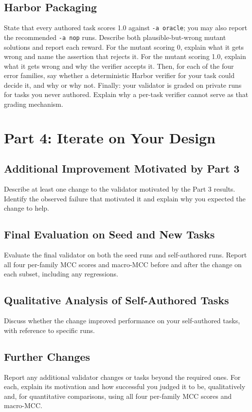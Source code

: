 \documentclass[11pt]{article}
\begin{document}
\subsection{Harbor Packaging}
State that every authored task scores 1.0 against \texttt{-a oracle}; you may
also report the recommended \texttt{-a nop} runs. Describe both plausible-but-wrong
mutant solutions and report each reward. For the mutant scoring 0, explain what
it gets wrong and name the assertion that rejects it. For the mutant scoring
1.0, explain what it gets wrong and why the verifier accepts it. Then, for each
of the four error families, say whether a deterministic Harbor verifier for your
task could decide it, and why or why not. Finally: your validator is graded on
private runs for tasks you never authored. Explain why a per-task verifier
cannot serve as that grading mechanism.

\section{Part 4: Iterate on Your Design}

\subsection{Additional Improvement Motivated by Part 3}
Describe at least one change to the validator motivated by the Part 3 results.
Identify the observed failure that motivated it and explain why you expected
the change to help.

\subsection{Final Evaluation on Seed and New Tasks}
Evaluate the final validator on both the seed runs and self-authored runs.
Report all four per-family MCC scores and macro-MCC before and after the change on each subset,
including any regressions.

\subsection{Qualitative Analysis of Self-Authored Tasks}
Discuss whether the change improved performance on your self-authored tasks,
with reference to specific runs.

\subsection{Further Changes}
Report any additional validator changes or tasks beyond the required ones.
For each, explain its motivation and how successful you judged it to be,
qualitatively and, for quantitative comparisons, using all four per-family MCC
scores and macro-MCC.
\end{document}
